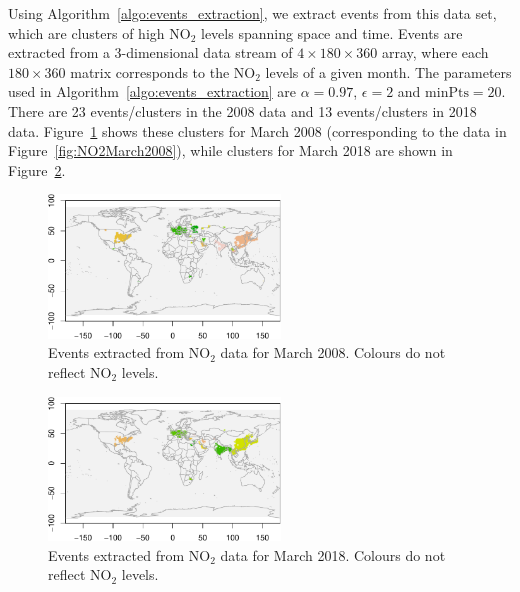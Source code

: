 \documentclass[a4paper,11pt]{article}
\begin{document}
Using Algorithm~\ref{algo:events_extraction}, we extract events from this data set, which are clusters of high $\text{NO}_2$ levels spanning space and time. Events are extracted from a 3-dimensional data stream of $4 \times 180 \times 360$ array, where each $180 \times 360$ matrix corresponds to the $\text{NO}_2$ levels of a given month. The parameters used in Algorithm~\ref{algo:events_extraction} are $\alpha = 0.97$, $\epsilon=2$ and $\text{minPts} = 20$. There are 23 events/clusters in the 2008 data and 13 events/clusters in 2018 data. Figure~\ref{fig:ClustersNO2March2008} shows these clusters for March 2008 (corresponding to the data in Figure~\ref{fig:NO2March2008}), while clusters for March 2018 are shown in Figure~\ref{fig:ClustersNO2March2018}.

\begin{figure}[!hb]
	\centering
		\includegraphics[width=0.55\textwidth]{./Graphics/Clusters_NO2_March_2008_With_Bndry.pdf}
	\caption{Events extracted from $\text{NO}_2$ data for March 2008. Colours do not reflect $\text{NO}_2$ levels.}
	\label{fig:ClustersNO2March2008}
\end{figure}

\begin{figure}[!htb]
	\centering
		\includegraphics[width=0.55\textwidth]{./Graphics/Clusters_NO2_March_2018_With_Bndry.pdf}
	\caption{Events extracted from $\text{NO}_2$ data for March 2018. Colours do not reflect $\text{NO}_2$ levels.}
	\label{fig:ClustersNO2March2018}
\end{figure}
\end{document}
